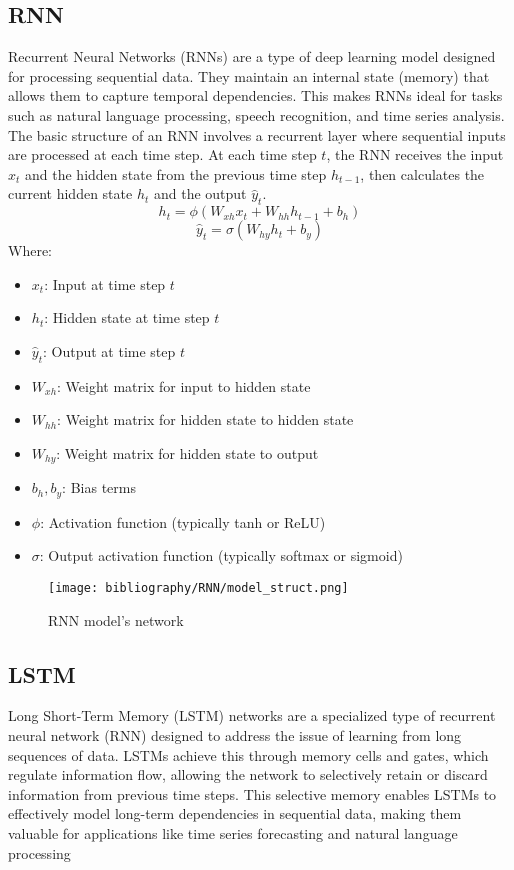 \documentclass{ieeeojies}
\begin{document}
\subsection{RNN} 
Recurrent Neural Networks (RNNs) are a type of deep learning model designed for processing sequential data. They maintain an internal state (memory) that allows them to capture temporal dependencies. This makes RNNs ideal for tasks such as natural language processing, speech recognition, and time series analysis. \\
The basic structure of an RNN involves a recurrent layer where sequential inputs are processed at each time step. At each time step \(t\), the RNN receives the input \(x_t\) and the hidden state from the previous time step \(h_{t-1}\), then calculates the current hidden state \(h_t\) and the output \(\hat{y}_t\). \cite{b10}
\[
h_t = \phi(W_{xh} x_t + W_{hh} h_{t-1} + b_h)
\]
\[
\hat{y}_t = \sigma(W_{hy} h_t + b_y)
\]
Where:
\begin{itemize}
    \item \(x_t\): Input at time step \(t\)
    \item \(h_t\): Hidden state at time step \(t\)
    \item \(\hat{y}_t\): Output at time step \(t\)
    \item \(W_{xh}\): Weight matrix for input to hidden state
    \item \(W_{hh}\): Weight matrix for hidden state to hidden state
    \item \(W_{hy}\): Weight matrix for hidden state to output
    \item \(b_h, b_y\): Bias terms
    \item \(\phi\): Activation function (typically tanh or ReLU)
    \item \(\sigma\): Output activation function (typically softmax or sigmoid)
\end{itemize}
\begin{figure}[H]
    \centering
    \begin{minipage}{0.45\textwidth}
    \centering
    \texttt{[image: bibliography/RNN/model\_struct.png]}    
    \label{fig:1}
    \caption{RNN model's network \cite{b11}}
    \end{minipage}
\end{figure}
\subsection{LSTM} 
Long Short-Term Memory (LSTM) networks are a specialized type of recurrent neural network (RNN) designed to address the issue of learning from long sequences of data. LSTMs achieve this through memory cells and gates, which regulate information flow, allowing the network to selectively retain or discard information from previous time steps. This selective memory enables LSTMs to effectively model long-term dependencies in sequential data, making them valuable for applications like time series forecasting and natural language processing \cite{b12}
\end{document}
